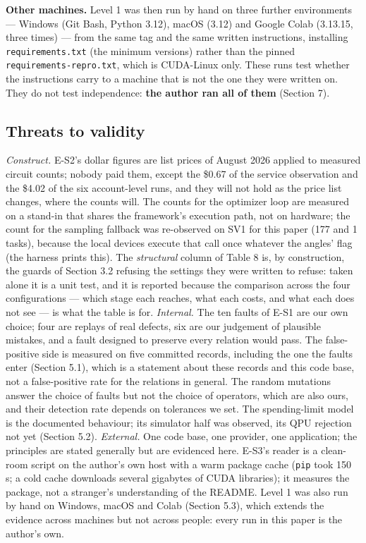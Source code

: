 \documentclass[acmsmall,screen,review]{acmart}
\begin{document}
\textbf{Other machines.} Level 1 was then run by hand on three further environments --- Windows (Git Bash, Python 3.12), macOS (3.12) and Google Colab (3.13.15, three times) --- from the same tag and the same written instructions, installing \texttt{requirements.txt} (the minimum versions) rather than the pinned \texttt{requirements-\allowbreak{}repro.\allowbreak{}txt}, which is CUDA-Linux only. These runs test whether the instructions carry to a machine that is not the one they were written on. They do not test independence: \textbf{the author ran all of them} (Section 7).


\subsection{Threats to validity}

\textit{Construct.} E-S2's dollar figures are list prices of August 2026 applied to measured circuit counts; nobody paid them, except the \$0.67 of the service observation and the \$4.02 of the six account-level runs, and they will not hold as the price list changes, where the counts will. The counts for the optimizer loop are measured on a stand-in that shares the framework's execution path, not on hardware; the count for the sampling fallback was re-observed on SV1 for this paper (177 and 1 tasks), because the local devices execute that call once whatever the angles' flag (the harness prints this). The \textit{structural} column of Table 8 is, by construction, the guards of Section 3.2 refusing the settings they were written to refuse: taken alone it is a unit test, and it is reported because the comparison across the four configurations --- which stage each reaches, what each costs, and what each does not see --- is what the table is for. \textit{Internal.} The ten faults of E-S1 are our own choice; four are replays of real defects, six are our judgement of plausible mistakes, and a fault designed to preserve every relation would pass. The false-positive side is measured on five committed records, including the one the faults enter (Section 5.1), which is a statement about these records and this code base, not a false-positive rate for the relations in general. The random mutations answer the choice of faults but not the choice of operators, which are also ours, and their detection rate depends on tolerances we set. The spending-limit model is the documented behaviour; its simulator half was observed, its QPU rejection not yet (Section 5.2). \textit{External.} One code base, one provider, one application; the principles are stated generally but are evidenced here. E-S3's reader is a clean-room script on the author's own host with a warm package cache (\texttt{pip} took 150 s; a cold cache downloads several gigabytes of CUDA libraries); it measures the package, not a stranger's understanding of the README. Level 1 was also run by hand on Windows, macOS and Colab (Section 5.3), which extends the evidence across machines but not across people: every run in this paper is the author's own.
\end{document}

